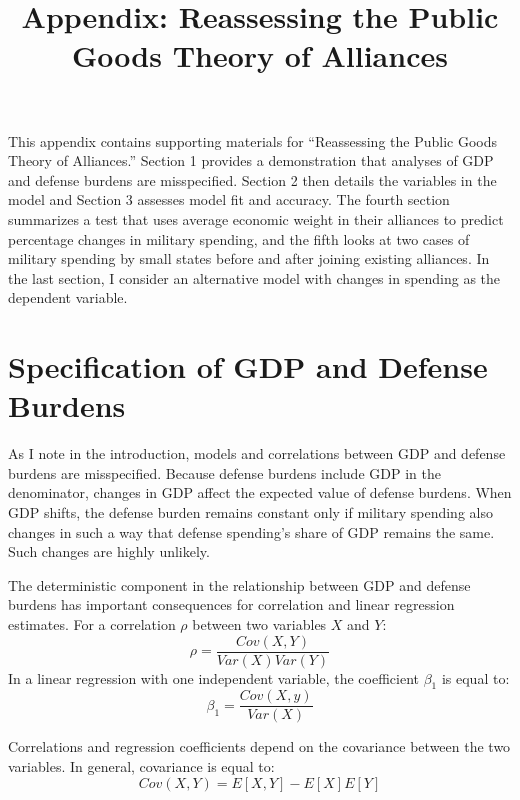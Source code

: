 \documentclass[12pt]{article}
\title{
\textbf{Appendix: Reassessing the Public Goods Theory of Alliances}
	}
\begin{document}
\maketitle 

\doublespace

This appendix contains supporting materials for ``Reassessing the Public Goods Theory of Alliances.'' 
Section 1 provides a demonstration that analyses of GDP and defense burdens are misspecified. 
Section 2 then details the variables in the model and Section 3 assesses model fit and accuracy. 
The fourth section summarizes a test that uses average economic weight in their alliances to predict percentage changes in military spending, and the fifth looks at two cases of military spending by small states before and after joining existing alliances.
In the last section, I consider an alternative model with changes in spending as the dependent variable. 


\section{Specification of GDP and Defense Burdens} 

As I note in the introduction, models and correlations between GDP and defense burdens are misspecified. 
Because defense burdens include GDP in the denominator, changes in GDP affect the expected value of defense burdens. 
When GDP shifts, the defense burden remains constant only if military spending also changes in such a way that defense spending's share of GDP remains the same.
Such changes are highly unlikely.


The deterministic component in the relationship between GDP and defense burdens has important consequences for correlation and linear regression estimates. 
For a correlation $\rho$ between two variables $X$ and $Y$:
\begin{equation}
\rho = \frac{Cov(X,Y)}{Var(X)Var(Y)} 
\end{equation}
In a linear regression with one independent variable, the coefficient $\beta_1$ is equal to:
\begin{equation}
\beta_1 = \frac{Cov(X,y)}{Var(X)} 
\end{equation} 

Correlations and regression coefficients depend on the covariance between the two variables. 
In general, covariance is equal to:
\begin{equation}
Cov(X, Y) = E[X,Y] - E[X] E[Y]
\end{equation}
\end{document}
